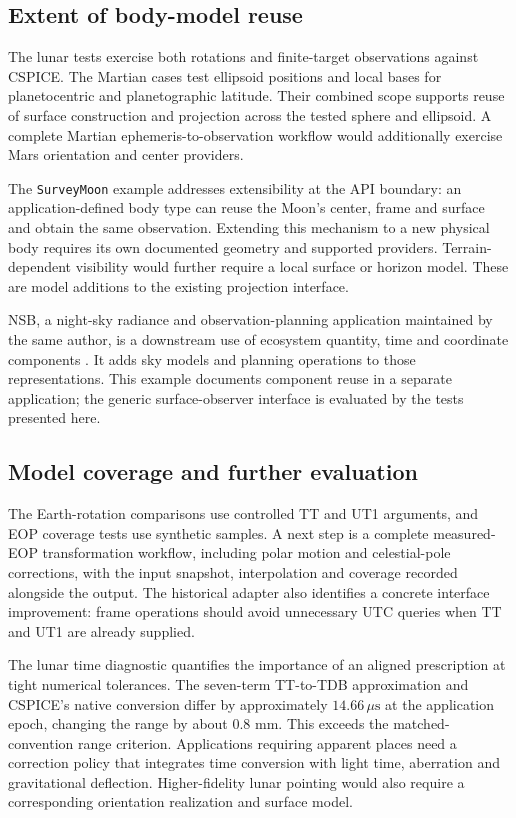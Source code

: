 \subsection{Extent of body-model reuse}

The lunar tests exercise both rotations and finite-target observations against CSPICE. The Martian
cases test ellipsoid positions and local bases for planetocentric and planetographic latitude.
Their combined scope supports reuse of surface construction and projection across the tested sphere
and ellipsoid. A complete Martian ephemeris-to-observation workflow would additionally exercise
Mars orientation and center providers.

The \texttt{SurveyMoon} example addresses extensibility at the API boundary: an application-defined
body type can reuse the Moon's center, frame and surface and obtain the same observation. Extending
this mechanism to a new physical body requires its own documented geometry and supported providers.
Terrain-dependent visibility would further require a local surface or horizon model. These are
model additions to the existing projection interface.

NSB, a night-sky radiance and observation-planning application maintained by the same author, is a
downstream use of ecosystem quantity, time and coordinate components
\cite{Valles_Puig_NSB_Night-Sky_Background}. It adds sky models and planning operations to those
representations. This example documents component reuse in a separate application; the generic
surface-observer interface is evaluated by the tests presented here.

\subsection{Model coverage and further evaluation}

The Earth-rotation comparisons use controlled TT and UT1 arguments, and EOP coverage tests use
synthetic samples. A next step is a complete measured-EOP transformation workflow, including polar
motion and celestial-pole corrections, with the input snapshot, interpolation and coverage recorded
alongside the output. The historical adapter also identifies a concrete interface improvement:
frame operations should avoid unnecessary UTC queries when TT and UT1 are already supplied.

The lunar time diagnostic quantifies the importance of an aligned prescription at tight numerical
tolerances. The seven-term TT-to-TDB approximation and CSPICE's native conversion differ by
approximately $14.66\,\mu\mathrm{s}$ at the application epoch, changing the range by about $0.8$
mm. This exceeds the matched-convention range criterion. Applications requiring apparent places
need a correction policy that integrates time conversion with light time, aberration and
gravitational deflection. Higher-fidelity lunar pointing would also require a corresponding
orientation realization and surface model.

